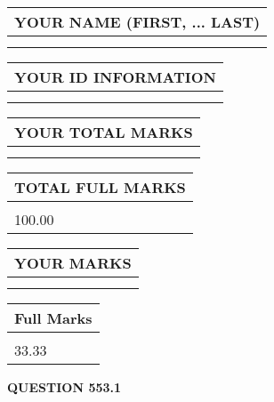 \documentclass{ctexart}
\begin{document}
   
   
   
\newpage 
\setcounter{page}{ 
   553001 } 
   
   
   
   
\noindent\begin{tabular}{|l|}
\hline
YOUR NAME (FIRST, ... LAST)  \\
\hline
 \\ 
 \\ 
\hline
\end{tabular}
\hspace{0.05in} \begin{tabular}{|l|}
\hline
 YOUR   ID   INFORMATION  \\
\hline
 \\ 
 \\ 
\hline
\end{tabular}
   
   
\vspace{0.2in}\noindent\begin{tabular}{|l|}
\hline
YOUR TOTAL MARKS  \\
\hline
 \\ 
 \\ 
\hline
\end{tabular}
\hspace{0.05in} \begin{tabular}{|l|}
\hline
TOTAL FULL MARKS  \\
\hline
 \\ 
100.00 \\
\hline
\end{tabular}
   
   
 \vspace{0.2in}
 
 
 
 
   
   
  
\vspace{0.2in}
  
\noindent\begin{tabular}{|l|}
\hline
 YOUR MARKS  \\
\hline
 \\ 
 \\ 
\hline
\end{tabular}
\hspace{0.05in} \begin{tabular}{|l|}
\hline
 Full Marks  \\
\hline
 \\ 
33.33 \\
\hline
\end{tabular}
{\textbf{\Large{QUESTION
553.1 
}}}
  
\end{document}
